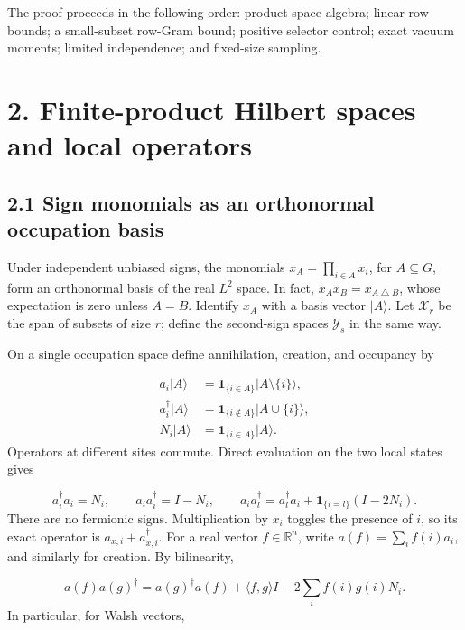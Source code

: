 \documentclass[11pt,a4paper]{article}
\begin{document}
The proof proceeds in the following order: product-space algebra; linear row bounds; a small-subset row-Gram bound; positive selector control; exact vacuum moments; limited independence; and fixed-size sampling.

\section*{2. Finite-product Hilbert spaces and local operators}
\subsection*{2.1 Sign monomials as an orthonormal occupation basis}
Under independent unbiased signs, the monomials \(x_A=\prod_{i\in A}x_i\), for \(A\subseteq G\), form an orthonormal basis of the real \(L^2\) space. In fact, \(x_Ax_B=x_{A\mathbin{\triangle}B}\), whose expectation is zero unless \(A=B\). Identify \(x_A\) with a basis vector \(|A\rangle\). Let \(\mathcal X_r\) be the span of subsets of size \(r\); define the second-sign spaces \(\mathcal Y_s\) in the same way.

On a single occupation space define annihilation, creation, and occupancy by

\begin{equation}
\begin{aligned}
a_i|A\rangle&=\mathbf1_{\{i\in A\}}|A\setminus\{i\}\rangle,\\
a_i^\dagger|A\rangle&=\mathbf1_{\{i\notin A\}}|A\cup\{i\}\rangle,\\
N_i|A\rangle&=\mathbf1_{\{i\in A\}}|A\rangle .
\end{aligned}
\tag{2.1}
\end{equation}
Operators at different sites commute. Direct evaluation on the two local states gives

\begin{equation}
a_i^\dagger a_i=N_i,\qquad
a_i a_i^\dagger=I-N_i,\qquad
a_i a_l^\dagger=a_l^\dagger a_i+
\mathbf1_{\{i=l\}}(I-2N_i).
\tag{2.2}
\end{equation}
There are no fermionic signs. Multiplication by \(x_i\) toggles the presence of \(i\), so its exact operator is \(a_{x,i}+a_{x,i}^\dagger\). For a real vector \(f\in\mathbb R^n\), write \(a(f)=\sum_i f(i)a_i\), and similarly for creation. By bilinearity,

\begin{equation}
a(f)a(g)^\dagger
=a(g)^\dagger a(f)+\langle f,g\rangle I
-2\sum_i f(i)g(i)N_i .
\tag{2.3}
\end{equation}
In particular, for Walsh vectors,
\end{document}
